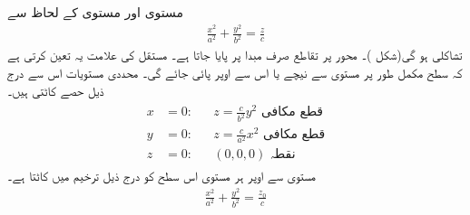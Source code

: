 مستوی   اور مستوی  کے لحاظ سے 
\begin{align}\label{مساوات_ترخیمی_قطع_مکافی_سطح}
\frac{x^2}{a^2}+\frac{y^2}{b^2}=\frac{z}{c}
\end{align}
تشاکلی ہو گی(شکل )۔ محور پر تقاطع  صرف مبدا پر  پایا جاتا ہے۔ مستقل   کی علامت   یہ  تعین کرتی ہے کہ  سطح     مکمل    طور پر مستوی   سے نیچے یا اس سے اوپر پائی  جائے گی۔ محددی مستویات  اس سے درج ذیل حصے کاٹتی ہیں۔
\begin{gather}
\begin{aligned}
x&=0:&& z=\frac{c}{b^2}y^2\,\,\text{قطع مکافی}\\
y&=0:&&z=\frac{c}{a^2}x^2\,\,\text{قطع مکافی}\\
z&=0:&&(0,0,0)\,\,\text{نقطہ}
\end{aligned}
\end{gather}
مستوی  سے اوپر ہر مستوی   اس سطح  کو درج ذیل ترخیم میں کاٹتا ہے۔
\begin{align*}
\frac{x^2}{a^2}+\frac{y^2}{b^2}=\frac{z_0}{c}
\end{align*}
